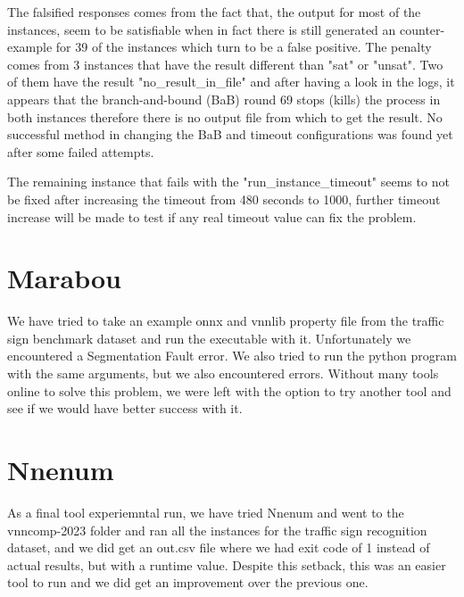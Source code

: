 \documentclass[12pt,a4paper]{report}
\newcommand\tab[1][5mm]{\hspace*{#1}}
\begin{document}
The falsified responses comes from the fact that, the output for most of the instances, seem to be satisfiable when in fact there is still generated an counter-example for 39 of the instances which turn to be a false positive. The penalty comes from 3 instances that have the result different than "sat" or "unsat". Two of them have the result "no\_result\_in\_file" and after having a look in the logs, it appears that the branch-and-bound (BaB) round 69 stops (kills) the process in both instances therefore there is no output file from which to get the result. No successful method in changing the BaB and timeout configurations was found yet after some failed attempts.

The remaining instance that fails with the "run\_instance\_timeout" seems to not be fixed after increasing the timeout from 480 seconds to 1000, further timeout increase will be made to test if any real timeout value can fix the problem.

\section{Marabou}
\tab We have tried to take an example onnx and vnnlib property file from the traffic sign benchmark dataset and run the executable with it. Unfortunately we encountered a Segmentation Fault error. We also tried to run the python program with the same arguments, but we also encountered errors. Without many tools online to solve this problem, we were left with the option to try another tool and see if we would have better success with it.

\section{Nnenum}
\tab As a final tool experiemntal run, we have tried Nnenum and went to the vnncomp-2023 folder and ran all the instances for the traffic sign recognition dataset, and we did get an out.csv file where we had exit code of 1 instead of actual results, but with a runtime value. Despite this setback, this was an easier tool to run and we did get an improvement over the previous one.
\end{document}
